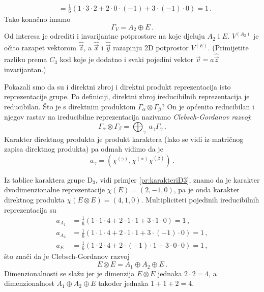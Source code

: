 \begin{primjer}
\begin{align*}
 & =\frac{1}{6}(1\cdot 3\cdot 2 + 2\cdot 0\cdot (-1) + 3\cdot (-1)\cdot 0)=1 \,. 
\end{align*}
Tako konačno imamo
\begin{equation}
\Gamma_V  = A_2 \oplus E \,.
\end{equation}
Od interesa je odrediti i invarijantne potprostore na koje djeluju
$A_2$ i $E$. 
$V^{(A_2)}$ je očito razapet vektorom $\hat{\vec{z}}$, a $\hat{\vec{x}}$ i
$\hat{\vec{y}}$ razapinju 2D potprostor $V^{(E)}$. (Primijetite razliku
prema $C_3$ kod koje je dodatno i svaki pojedini vektor $\vec{v}=a\hat{\vec{z}}$ invarijantan.)
\end{primjer}


Pokazali smo da su i direktni zbroj i direktni produkt reprezentacija
isto reprezentacije grupe. Po definiciji, direktni zbroj ireducibilnih
reprezentacija je reducibilan.
Što je s direktnim produktom  $\Gamma_{\alpha} \otimes \Gamma_{\beta}$?
On je općenito reducibilan i njegov rastav na ireducibilne reprezentacija
nazivamo \emph{Clebsch-Gordanov razvoj}:
\begin{displaymath}
  \Gamma_{\alpha}\otimes\Gamma_{\beta} =
  \bigoplus_{\gamma} \: a_{\gamma}\Gamma_{\gamma}  \,.
\end{displaymath}
Karakter direktnog produkta je produkt karaktera (lako se vidi iz
matričnog zapisa direktnog produkta) pa odmah vidimo da je
\begin{displaymath}
a_{\gamma}  = (\chi^{(\gamma)}, \chi^{(\alpha)}\chi^{(\beta)}) \,.
\end{displaymath}

\begin{primjer}
Iz tablice karaktera grupe D$_3$, vidi primjer \ref{pr:karakteriD3}, znamo
da je karakter dvodimenzionalne reprezentacije $\chi(E)=(2, -1, 0)$,
pa je onda karakter direktnog produkta
$ \chi(E\otimes E)=(4, 1, 0)$.
Multipliciteti pojedinih ireducibilnih reprezentacija su
\begin{align*}
    a_{A_1}& =\frac{1}{6}(1\cdot 1\cdot 4+2\cdot 1\cdot 1+3\cdot 1\cdot 0)=1 \,, \\
    a_{A_2}& =\frac{1}{6}(1\cdot 1\cdot 4+2\cdot 1\cdot 1+3\cdot (-1)\cdot 0)=1 \,, \\
    a_{E}& =\frac{1}{6}(1\cdot 2\cdot 4+2\cdot (-1)\cdot 1+3\cdot 0\cdot 0)=1\,, 
\end{align*}
što znači da je Clebsch-Gordanov razvoj
\begin{equation}
E\otimes E = A_1 \oplus A_2 \oplus E  \,.
\end{equation}
Dimenzionalnosti se slažu jer je dimenzija $E\otimes E$ jednaka $2\cdot 2=4$, a dimenzionalnost
$A_1 \oplus A_2 \oplus E$ također jednaka $1+1+2=4$.
\end{primjer}


